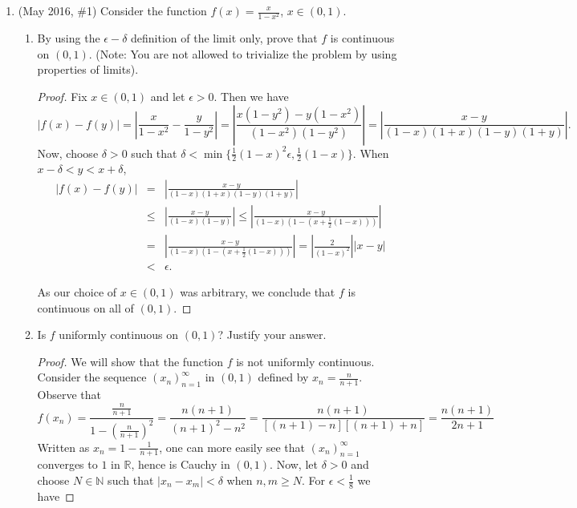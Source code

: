 \documentclass[reqno]{article}
\theoremstyle{remark}
\numberwithin{equation}{section}
\newcommand{\N}{\mathbb{N}}
\newcommand{\R}{\mathbb{R}}
\begin{document}
\begin{enumerate}

\item (May 2016, \#1) Consider the function $f(x) = \frac{x}{1-x^2}$, $x \in (0,1)$. 

\begin{enumerate} 

\item By using the $\epsilon-\delta$ definition of the limit only, prove that $f$ is continuous on $(0,1)$. (Note: You are not allowed to trivialize the problem by using properties of limits). 

\begin{proof}
    Fix $x\in (0,1)$ and let $\epsilon > 0$. Then we have 
    $$
        \left |f(x) - f(y) \right| 
        = \left|\frac{x}{1-x^2} - \frac{y}{1-y^2}\right| 
        = \left| \frac{x(1-y^2) - y(1-x^2)}{(1-x^2)(1-y^2)} \right|
        = \left| \frac{x-y}{(1-x)(1+x)(1-y)(1+y)} \right|.
    $$
    Now, choose $\delta > 0$ such that $\delta < \min\{\frac{1}{2}(1-x)^2\epsilon, \frac{1}{2}(1-x)\}$. When 
    $x - \delta < y < x + \delta$,
    \begin{eqnarray*}
        |f(x) - f(y) | & = & 
        \left| \frac{x-y}{(1-x)(1+x)(1-y)(1+y)} \right| \\
        & \leq & \left| \frac{x-y}{(1-x)(1-y)} \right| 
        \leq  \left| \frac{x-y}{(1-x)(1-(x+ \frac{1}{2}(1 - x)))} \right| \\
        & = & \left| \frac{x-y}{(1-x)(1-(x+ \frac{1}{2}(1 - x)))} \right|
        = \left| \frac{2}{(1-x)^2} \right||x-y| \\
        & < & \epsilon.
    \end{eqnarray*}
    
    As our choice of $x\in (0,1)$ was arbitrary, we conclude that 
    $f$ is continuous on all of $(0,1)$.
\end{proof} 

\item Is $f$ uniformly continuous on $(0,1)$? Justify your answer. 

\begin{proof}
We will show that the function $f$ is not uniformly continuous. Consider the sequence $(x_n)_{n=1}^\infty$ in $(0,1)$ defined by $x_n = \frac{n}{n+1}$. Observe that 
$$
    f(x_n) = \frac{\frac{n}{n+1}}{1-\left(\frac{n}{n+1}\right)^2} 
    = \frac{n(n+1)}{(n+1)^2 - n^2} = \frac{n(n+1)}{[(n+1)-n][(n+1)+n]} 
    = \frac{n(n+1)}{2n+1}
$$  
Written as $x_n = 1 - \frac{1}{n+1}$, one can more easily see that $(x_n)_{n=1}^\infty$ converges to $1$ in $\R$, hence is Cauchy in $(0,1)$. Now, let $\delta > 0$ and choose $N\in \N$ such that 
$|x_n - x_m| < \delta $ when $n,m \geq N$. For $\epsilon < \frac{1}{8}$ we have 


\end{proof}
\end{enumerate}
\end{enumerate}
\end{document}
